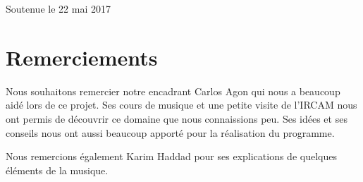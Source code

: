\documentclass[a4paper,12pt]{article}
\begin{document}
\begin{titlepage}
\begin{center}
\vspace*{2cm}

{\large Soutenue le 22 mai 2017}\\[1cm]

\vfill

\end{center}
\end{titlepage}


\newpage\null\thispagestyle{empty}\newpage


\tableofcontents

\newpage\null\thispagestyle{empty}\newpage



\section{Remerciements}

Nous souhaitons remercier notre encadrant Carlos Agon qui nous a beaucoup aidé lors de ce projet. Ses cours de musique et une petite visite de l'IRCAM nous ont permis de découvrir ce domaine que nous connaissions peu. Ses idées et ses conseils nous ont aussi beaucoup apporté pour la réalisation du programme.

\par
Nous remercions également Karim Haddad pour ses explications de quelques éléments de la musique.


\newpage\null\thispagestyle{empty}\newpage



\listoffigures %

\newpage\null\thispagestyle{empty}\newpage







\end{document}
